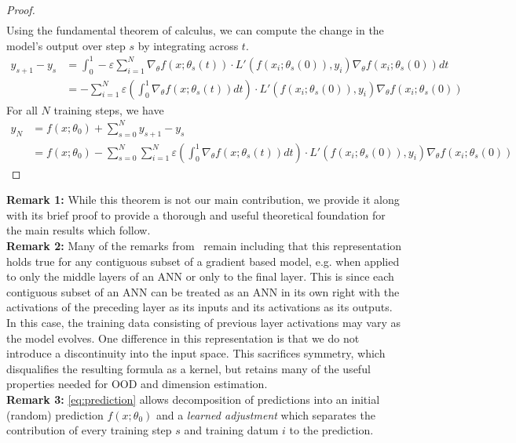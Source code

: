 \begin{proof}
\begin{align}
\end{align}
Using the fundamental theorem of calculus, we can compute the change in the model's output over step $s$ by integrating across $t$.
\begin{align}
    y_{s+1} - y_s &= \int_0^1 - \varepsilon \sum_{i = 1}^{N}   \nabla_\theta f(x; \theta_s(t)) \cdot L'(f(x_i; \theta_s(0)), y_i) \nabla_\theta f(x_i; \theta_s(0))dt\\
 &=  - \sum_{i = 1}^{N} \varepsilon\left(\int_0^1\nabla_\theta f(x; \theta_s(t))dt\right) \cdot L'(f(x_i; \theta_s(0)), y_i)   \nabla_\theta f(x_i; \theta_s(0))
\end{align}
For all $N$ training steps, we have
\begin{align}
y_N &= f(x; \theta_0) + \sum_{s=0}^N y_{s+1} - y_s \\
&= f(x; \theta_0) - \sum_{s=0}^N \sum_{i = 1}^{N} \varepsilon \left(\int_0^1\nabla_\theta f(x; \theta_s(t))dt\right)  \cdot L'(f(x_i; \theta_s(0)), y_i)   \nabla_\theta f(x_i; \theta_s(0)) \label{eq:prediction}
\end{align}
\end{proof}
    
\textbf{Remark 1:} While this theorem is not our main contribution, we provide it along with its brief proof to provide a thorough and useful theoretical foundation for the main results which follow. \\
\textbf{Remark 2:} Many of the remarks from~\citet{bell2023} remain including that this representation holds true for any contiguous subset of a gradient based model, e.g. when applied to only the middle layers of an ANN or only to the final layer. 
This is since each contiguous subset of an ANN can be treated as an ANN in its own right with the activations of the preceding layer as its inputs and its activations as its outputs. 
In this case, the training data consisting of previous layer activations may vary as the model evolves.
One difference in this representation is that we do not introduce a discontinuity into the input space.
This sacrifices symmetry, which disqualifies the resulting formula as a kernel, but retains many of the useful properties needed for OOD and dimension estimation.\\
\textbf{Remark 3:} \eqref{eq:prediction} allows decomposition of predictions into an initial (random) prediction $f(x; \theta_0)$ and a \emph{learned adjustment} which separates the contribution of every training step $s$ and training datum $i$ to the prediction. %

